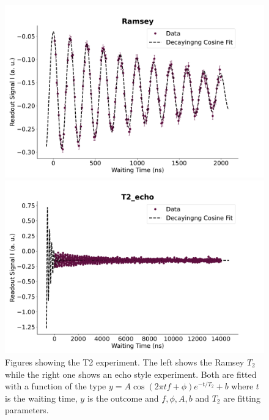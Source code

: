 \begin{figure}[t]
    \begin{minipage}{0.50\linewidth}
        \centering
        \includegraphics[width=1.0\linewidth]{Calibrations/Figures/Ramsey.pdf} %
    \end{minipage}
    \begin{minipage}{0.50\linewidth}
        \centering
        \includegraphics[width=1.0\linewidth]{Calibrations/Figures/T2_echo.pdf} %
    \end{minipage}
    \caption{Figures showing the T2 experiment. The left shows the Ramsey $T_2$ while the right one shows an echo style experiment. Both are fitted with a function of the type $y = A \cos(2 \pi t f + \phi) e^{-t / T_2} + b$ where $t$ is the waiting time, $y$ is the outcome and $f, \phi, A, b$ and $T_2$ are fitting parameters.}
\end{figure}

